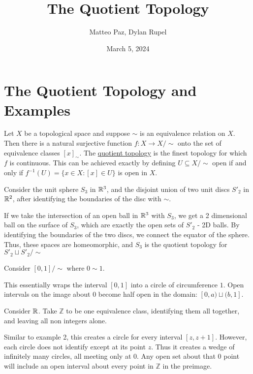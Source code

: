 \documentclass{article}
\author{Matteo Paz, Dylan Rupel}
\date{March 5, 2024}
\title{The Quotient Topology}
\begin{document}
\maketitle

\section{The Quotient Topology and Examples}
\begin{definition}
    Let $X$ be a topological space and suppose $\sim$ is an equivalence relation on $X$. Then there is a natural surjective function $f: X \to X / \sim$ onto the set of equivalence classes $[x]_\sim$. The \underline{quotient topology} is the finest topology for which $f$ is continuous. This can be achieved exactly by defining $U \subseteq X / \sim$ open if and only if $f^{-1}(U) = \{x \in X : [x] \in U\}$ is open in $X$.
\end{definition}

\begin{example}
    Consider the unit sphere $S_3$ in $\mathbb{R}^3$, and the disjoint union of two unit discs $S'_2$ in $\mathbb{R}^2$, after identifying the boundaries of the disc with $\sim$.
\end{example}

If we take the intersection of an open ball in $\mathbb{R}^3$ with $S_3$, we get a 2 dimensional ball on the surface of $S_3$, which are exactly the open sets of $S'_2$ - 2D balls. By identifying the boundaries of the two discs, we connect the equator of the sphere. Thus, these spaces are homeomorphic, and $S_3$ is the quotient topology for $S'_2 \sqcup S'_2 / \sim$

\begin{example}
    Consider $[0,1] / \sim$ where $0 \sim 1$.
\end{example}

This essentially wraps the interval $[0,1]$ into a circle of circumference $1$. Open intervals on the image about $0$ become half open in the domain: $[0,a) \sqcup (b, 1]$.

\begin{example}
    Consider $\mathbb{R}$. Take $\mathbb{Z}$ to be one equivalence class, identifying them all together, and leaving all non integers alone.
\end{example}

    Similar to example 2, this creates a circle for every interval $[z,z+1]$. However, each circle does not identify except at its point $z$. Thus it creates a wedge of infinitely many circles, all meeting only at $0$. Any open set about that $0$ point will include an open interval about every point in $\mathbb{Z}$ in the preimage.
\end{document}
